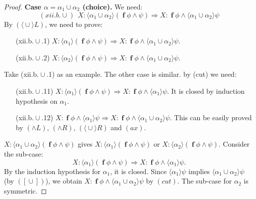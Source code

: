 \documentclass[manuscript,screen]{acmart}
\newcommand{\la}[0]{\langle}
\newcommand{\ra}[0]{\rangle}
\DeclareMathOperator{\cho}{\cup}
\DeclareMathOperator{\ofst}{\mathbf{f}}
\begin{document}
\begin{proof}
\textbf{Case $\alpha = \alpha_1\cho\alpha_2$ (choice).} We need:
$$
(xii.b.\cup)\ \ X : \la\alpha_1\cho\alpha_2\ra(\ofst\phi\wedge\psi)\Rightarrow X : \ofst\phi\wedge\la\alpha_1\cho\alpha_2\ra\psi
$$
By $(\la\cho\ra L)$, we need to prove:
\begin{enumerate}
\item[(xii.b.$\cho$.1)] $X : \la\alpha_1\ra(\ofst\phi\wedge\psi)\Rightarrow X : \ofst\phi\wedge\la\alpha_1\cho\alpha_2\ra\psi$.
\item[(xii.b.$\cho$.2)]  $X : \la\alpha_2\ra(\ofst\phi\wedge\psi)\Rightarrow X : \ofst\phi\wedge\la\alpha_1\cho\alpha_2\ra\psi$.
\end{enumerate}
Take (xii.b.$\cho$.1) as an example. The other case is similar. 
by (cut) we need:
\begin{enumerate}
\item[(xii.b.$\cho$.11)]  $X : \la\alpha_1\ra(\ofst\phi\wedge\psi)\Rightarrow X : \ofst \phi\wedge \la\alpha_1\ra\psi$. It is closed by induction hypothesis on $\alpha_1$. 
\item[(xii.b.$\cho$.12)]  $X : \ofst \phi\wedge \la\alpha_1\ra\psi\Rightarrow X : \ofst\phi\wedge\la\alpha_1\cho\alpha_2\ra\psi$. This can be easily proved by $(\wedge L)$, $(\wedge R)$, $(\la\cho\ra R)$ and $(ax)$. 
\end{enumerate}
\ifx
$X : \la\alpha_1\cho\alpha_2\ra(\ofst\phi\wedge\psi)$ gives $X : \la\alpha_1\ra(\ofst\phi\wedge\psi)$ or $X : \la\alpha_2\ra(\ofst\phi\wedge\psi)$. Consider the sub-case: 
$$
X : \la\alpha_1\ra(\ofst\phi\wedge\psi)\Rightarrow X : \ofst\phi\wedge\la\alpha_1\ra\psi. 
$$
By the induction hypothesis for $\alpha_1$, it is closed. 
Since $\la\alpha_1\ra\psi$ implies $\la\alpha_1\cho\alpha_2\ra\psi$ (by $([\cho])$), we obtain $X : \ofst\phi\wedge\la\alpha_1\cho\alpha_2\ra\psi$ by $(\textit{cut})$. The sub-case for $\alpha_2$ is symmetric.
\fi


\end{proof}
\end{document}
